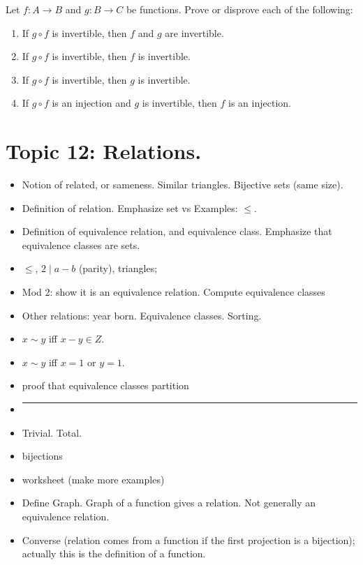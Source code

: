 \documentclass[12pt]{article}
\begin{document}
\begin{itemize}
   Let $f\colon A \to B$ and $g \colon B \to C$ be functions. Prove or
  disprove each of the following:
  \begin{enumerate}
  \item If $g \circ f$ is invertible, then $f$ and $g$ are invertible.
  \item If $g \circ f$ is invertible, then $f$ is invertible.
  \item If $g \circ f$ is invertible, then $g$ is invertible.
  \item If $g \circ f$ is an injection and $g$ is invertible, then $f$ is an
    injection.
  \end{enumerate}
\end{itemize}



\newpage
\section[12 (\csname dateWeek12\endcsname): Relations]{Topic  12: Relations.}

\begin{itemize}
\item Notion of related, or sameness. Similar triangles. Bijective sets (same size).
\item Definition of relation. Emphasize set vs  Examples: $\leq$. 
\item Definition of equivalence relation, and equivalence class. Emphasize that equivalence classes are sets. 
\item $\leq$, $2 \mid a - b$ (parity), triangles; 
\item Mod 2: show it is an equivalence relation. Compute equivalence classes
\item Other relations: year born. Equivalence classes. Sorting. 
\item $x \sim y$ iff $x -y \in Z$.   
\item $x \sim y$ iff $x = 1$ or $y = 1$.   
\item proof that equivalence classes partition
\item []       \vspace{0.1cm}\hrule\vspace{-0.4cm}         
\item Trivial. Total.  
\item bijections
\item worksheet (make more examples)
\item Define Graph. Graph of a function gives a relation. Not generally an equivalence relation.
\item Converse (relation comes from a function if the first projection is a bijection); actually this is the definition of a function.


\end{itemize}
\end{document}
